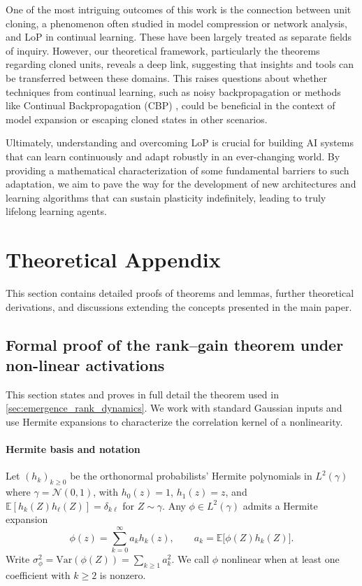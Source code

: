 \documentclass{article}
\numberwithin{figure}{section}
\begin{document}
One of the most intriguing outcomes of this work is the connection between unit cloning, a phenomenon often studied in model compression or network analysis, and LoP in continual learning. These have been largely treated as separate fields of inquiry. However, our theoretical framework, particularly the theorems regarding cloned units, reveals a deep link, suggesting that insights and tools can be transferred between these domains. This raises questions about whether techniques from continual learning, such as noisy backpropagation or methods like Continual Backpropagation (CBP) \citep{dohare2024loss}, could be beneficial in the context of model expansion or escaping cloned states in other scenarios.

Ultimately, understanding and overcoming LoP is crucial for building AI systems that can learn continuously and adapt robustly in an ever-changing world. By providing a mathematical characterization of some fundamental barriers to such adaptation, we aim to pave the way for the development of new architectures and learning algorithms that can sustain plasticity indefinitely, leading to truly lifelong learning agents.



\newpage 
\appendix
\section{Theoretical Appendix}
\label{app:theory_appendix}
This section contains detailed proofs of theorems and lemmas, further theoretical derivations, and discussions extending the concepts presented in the main paper. 


\subsection{Formal proof of the rank–gain theorem under non-linear activations}
\label{app:rank_gain_proof}
\label{app:max_rank_frozen}

This section states and proves in full detail the theorem used in \cref{sec:emergence_rank_dynamics}. We work with standard Gaussian inputs and use Hermite expansions to characterize the correlation kernel of a nonlinearity.

\paragraph{Hermite basis and notation}
Let $(h_k)_{k\ge 0}$ be the orthonormal probabilists' Hermite polynomials in $L^2(\gamma)$ where $\gamma=\mathcal{N}(0,1)$, with $h_0(z)=1$, $h_1(z)=z$, and $\mathbb{E}[h_k(Z)h_\ell(Z)]=\delta_{k\ell}$ for $Z\sim\gamma$. Any $\phi\in L^2(\gamma)$ admits a Hermite expansion
\[
\phi(z)=\sum_{k=0}^\infty a_k h_k(z), \qquad a_k=\mathbb{E}\big[\phi(Z)h_k(Z)\big].
\]
Write $\sigma_\phi^2=\mathrm{Var}(\phi(Z))=\sum_{k\ge 1} a_k^2$. We call $\phi$ nonlinear when at least one coefficient with $k\ge 2$ is nonzero.
\end{document}
